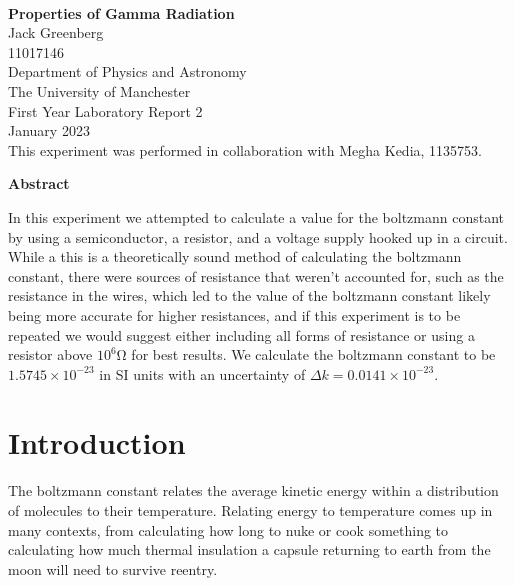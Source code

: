 \documentclass[12pt, a4paper]{article}
\begin{document}
\begin{center}

\noindent \\[10pt]
\color{black}

\thispagestyle{empty} %

\Large{\textbf{Properties of Gamma Radiation}} \\[30pt]
\normalsize Jack Greenberg\\[5pt]
11017146\\[20pt]
Department of Physics and Astronomy \\[5pt]
The University of Manchester \\[20pt]
First Year Laboratory Report 2 \\[20pt]
January 2023 \\[25pt]
This experiment was performed in collaboration with Megha Kedia,
1135753. \\ [115pt]

\end{center}

\begin{center}

\textbf{Abstract}\\[12pt]

\end{center}

In this experiment we attempted to calculate a value for the boltzmann constant by using a semiconductor, a resistor, and a voltage supply hooked up in a circuit. While a this is a theoretically sound method of calculating the boltzmann constant, there were sources of resistance that weren't accounted for, such as the resistance in the wires, which led to the value of the boltzmann constant likely being more accurate for higher resistances, and if this experiment is to be repeated we would suggest either including all forms of resistance or using a resistor above $10^6$\si{\ohm} for best results. We calculate the boltzmann constant to be $1.5745 \times 10^{-23}$ in SI units with an uncertainty of $\Delta k = 0.0141 \times 10^{-23}$.

\noindent 

\pagebreak

\section{Introduction}
		The boltzmann constant relates the average kinetic energy within a distribution of molecules to their temperature. Relating energy to temperature comes up in many contexts, from calculating how long to nuke or cook something to calculating how much thermal insulation a capsule returning to earth from the moon will need to survive reentry.
\end{document}
